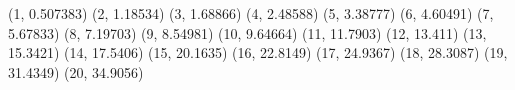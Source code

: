(1, 0.507383) (2, 1.18534) (3, 1.68866) (4, 2.48588) (5, 3.38777) (6, 4.60491) (7, 5.67833) (8, 7.19703) (9, 8.54981) (10, 9.64664) (11, 11.7903) (12, 13.411) (13, 15.3421) (14, 17.5406) (15, 20.1635) (16, 22.8149) (17, 24.9367) (18, 28.3087) (19, 31.4349) (20, 34.9056) 
